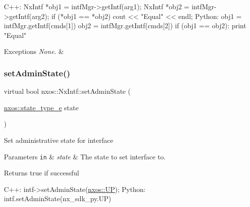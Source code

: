\begin{DoxyCode}
C++:
     NxIntf *obj1 = intfMgr->getIntf(arg1);
     NxIntf *obj2 = intfMgr->getIntf(arg2);
     \textcolor{keywordflow}{if} (*obj1 == *obj2)
         cout << \textcolor{stringliteral}{"Equal"} << endl;
Python:
     obj1 = intfMgr.getIntf(cmds[1])
     obj2 = intfMgr.getIntf(cmds[2])
     \textcolor{keywordflow}{if} (obj1 == obj2):
         print \textcolor{stringliteral}{"Equal"}
\end{DoxyCode}



\begin{DoxyExceptions}{Exceptions}
{\em None.} & \\
\hline
\end{DoxyExceptions}
\mbox{\label{classnxos_1_1_nx_intf_a2244d9def0a3538d1f66f8816ad8b545}} 
\subsubsection{\texorpdfstring{set\+Admin\+State()}{setAdminState()}}
{\footnotesize\ttfamily virtual bool nxos\+::\+Nx\+Intf\+::set\+Admin\+State (\begin{DoxyParamCaption}\item[{\mbox{\hyperlink{namespacenxos_a7c257059d03188765435b36e95dbb764}{nxos\+::state\+\_\+type\+\_\+e}}}]{state }\end{DoxyParamCaption})\hspace{0.3cm}{\ttfamily [pure virtual]}}

Set administrative state for interface 
\begin{DoxyParams}[1]{Parameters}
\mbox{\tt in}  & {\em state} & The state to set interface to. \\
\hline
\end{DoxyParams}
\begin{DoxyReturn}{Returns}
true if successful
\end{DoxyReturn}

\begin{DoxyCode}
C++:
   intf->setAdminState(\mbox{\hyperlink{namespacenxos_a7c257059d03188765435b36e95dbb764a7f57fa197f0e274e5c5d10c64d0f9436}{nxos::UP}});
Python:
   intf.setAdminState(nx\_sdk\_py.UP)
\end{DoxyCode}



